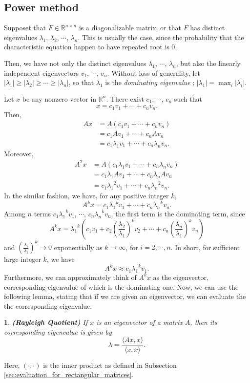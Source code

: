 \documentclass[12pt]{report}
\numberwithin{figure}{chapter}
\theoremstyle{plain}
\theoremstyle{definition}
\theoremstyle{corollary}
\theoremstyle{definition}
\theoremstyle{plain}
\theoremstyle{definition}
\theoremstyle{plain}
\newtheorem{lemma}[theorem]{\protect\lemmaname}
\providecommand{\lemmaname}{Lemma}
\begin{document}
\subsection{Power method}\label{sec:power_method}
Supposet that \(F\in\mathbb R^{n\times n}\) is a diagonalizable matrix, or that \(F\) has distinct eigenvalues \(\lambda_1\), \(\lambda_2\), \(\cdots\), \(\lambda_n\).
This is usually the case, since the probability that the characteristic equation happen to have repeated root is 0.

Then, we have not only the distinct eigenvalues \(\lambda_1\), \(\cdots\), \(\lambda_n\), but also the linearly independent eigenvectors \(v_1\), \(\cdots\), \(v_n\).
Without loss of generality, let \(|\lambda_1|\ge|\lambda_2|\ge\cdots\ge|\lambda_n|\), so that \(\lambda_1\) is the \emph{dominating eigenvalue} ; \(|\lambda_1|=\max_i|\lambda_i|\).

Let \(x\) be any nonzero vector in \(\mathbb R^n\).
There exist \(c_1\), \(\cdots\), \(c_n\) such that
\[x=c_1v_1+\cdots+c_nv_n.\]
Then,
\begin{align*}
Ax
&=A(c_1v_1+\cdots+c_nv_n)\\
&=c_1Av_1+\cdots+c_nAv_n\\
&=c_1\lambda_1v_1+\cdots+c_n\lambda_nv_n.
\end{align*}
Moreover,
\begin{align*}
A^2x
&=A(c_1\lambda_1v_1+\cdots+c_n\lambda_nv_n)\\
&=c_1\lambda_1Av_1+\cdots+c_n\lambda_nAv_n\\
&=c_1{\lambda_1}^2v_1+\cdots+c_n{\lambda_n}^2v_n.
\end{align*}
In the similar fashion, we have, for any positive integer \(k\),
\[A^kx=c_1{\lambda_1}^kv_1+\cdots+c_n{\lambda_n}^kv_n.\]
Among \(n\) terms \(c_1{\lambda_1}^kv_1\), \(\cdots\), \(c_n{\lambda_n}^kv_n\), the first term is the dominating term, since
\[A^kx={\lambda_1}^k\left(c_1v_1+c_2\left(\frac{\lambda_2}{\lambda_1}\right)^kv_2+\cdots+c_n\left(\frac{\lambda_n}{\lambda_1}\right)^kv_n\right)\]
and
\(\left(\frac{\lambda_i}{\lambda_1}\right)^k\to0\) exponentially as \(k\to\infty\), for \(i=2,\cdots,n\).
In short, for sufficient large integer \(k\), we have
\[A^kx\approx c_1{\lambda_1}^kv_1.\]
Furthermore, we can approximately think of \(A^kx\) as the eigenvector, corresponding eigenvalue of which is the dominating one.
Now, we can use the following lemma, stating that if we are given an eigenvector, we can evaluate the the corresponding eigenvalue.

\begin{lemma}\label{lemm:Rayleigh}
\textbf{(Rayleigh Quotient)}
If \(x\) is an eigenvector of a matrix \(A\), then its corresponding eigenvalue is given by
\[\lambda = \frac{\langle Ax,x\rangle}{\langle x,x\rangle}.\]
\end{lemma}
Here, \((\cdot,\cdot)\) is the inner product as defined in Subsection \ref{sec:evaluation_for_rectangular_matrices}.
\end{document}
